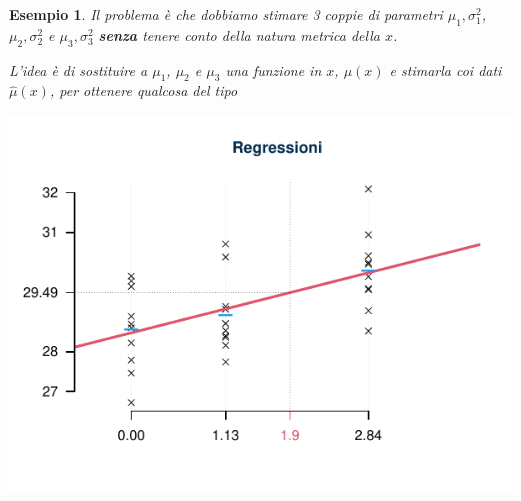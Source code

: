 \documentclass[
  11pt,
]{book}
\theoremstyle{mytheoremstyle}
\theoremstyle{mydefstyle}
\newtheorem{example}{{Esempio}}[section]
\begin{document}
\begin{example}
Il problema è che dobbiamo stimare 3 coppie di parametri \(\mu_1,\sigma^2_1\), \(\mu_2,\sigma^2_2\) e \(\mu_3,\sigma^2_3\)
\textbf{senza} tenere conto della natura metrica della \(x\).

L'idea è di sostituire a \(\mu_1\), \(\mu_2\) e \(\mu_3\) una funzione in \(x\), \(\mu(x)\) e stimarla coi dati \(\hat\mu(x)\),
per ottenere qualcosa del tipo

\begin{center}\includegraphics{Appunti_di_Statistica_2025_files/figure-latex/17-regressione-I-14a-1} \end{center}

\end{example}
\end{document}
